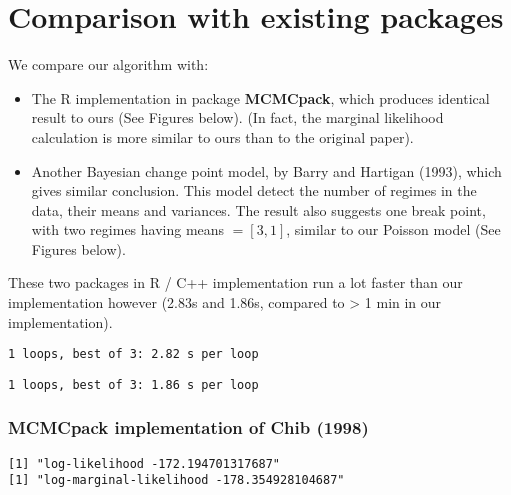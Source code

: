 \documentclass{article}
\begin{document}
    \section{Comparison with existing
packages}\label{comparison-with-existing-packages}

    We compare our algorithm with:

\begin{itemize}
\itemsep1pt\parskip0pt
\item
  The R implementation in package \textbf{MCMCpack}, which produces
  identical result to ours (See Figures below). (In fact, the marginal
  likelihood calculation is more similar to ours than to the original
  paper).
\item
  Another Bayesian change point model, by Barry and Hartigan (1993),
  which gives similar conclusion. This model detect the number of
  regimes in the data, their means and variances. The result also
  suggests one break point, with two regimes having means $= [3, 1]$,
  similar to our Poisson model (See Figures below).
\end{itemize}

These two packages in R / C++ implementation run a lot faster than our
implementation however (2.83s and 1.86s, compared to \textgreater{} 1
min in our implementation).


    \begin{Verbatim}[commandchars=\\\{\}]
1 loops, best of 3: 2.82 s per loop
    \end{Verbatim}


    \begin{Verbatim}[commandchars=\\\{\}]
1 loops, best of 3: 1.86 s per loop
    \end{Verbatim}

    \subsubsection{MCMCpack implementation of Chib
(1998)}\label{mcmcpack-implementation-of-chib-1998}


    
    \begin{verbatim}
[1] "log-likelihood -172.194701317687"
[1] "log-marginal-likelihood -178.354928104687"

    \end{verbatim}

    
    \begin{center}
    \end{center}
    { \hspace*{\fill} \\}
    
\end{document}
